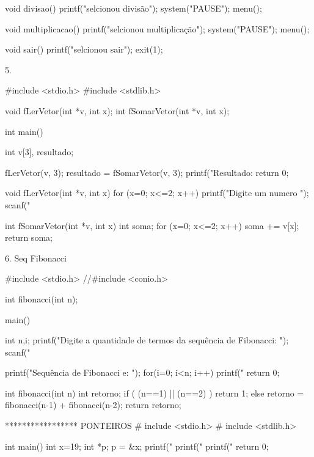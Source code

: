 void divisao(){
	printf("selcionou divisão");
	system("PAUSE");
	menu();
}

void multiplicacao(){
	printf("selcionou multiplicação");
	system("PAUSE");
	menu();
}

void sair(){
	printf("selcionou sair");
	exit(1);
}

5.

#include <stdio.h>
#include <stdlib.h>

void fLerVetor(int *v, int x);
int fSomarVetor(int *v, int x);

int main()
{ int v[3], resultado;

  fLerVetor(v, 3);
  resultado = fSomarVetor(v, 3);
  printf("Resultado: %
  return 0;
}

void fLerVetor(int *v, int x){
	for (x=0; x<=2; x++)
	{
		printf("Digite um numero \n");
		scanf("%
	}
}

int fSomarVetor(int *v, int x){
	int soma;
	for (x=0; x<=2; x++)
	{
		soma += v[x];
	}
	return soma;
}

6. Seq Fibonacci

#include <stdio.h>
//#include <conio.h> 

int fibonacci(int n);

main()
{
   int n,i;
   printf("Digite a quantidade de termos da sequência de Fibonacci: ");
   scanf("%

   printf("\nA Sequência de Fibonacci e: \n");
   for(i=0; i<n; i++)
       printf("%
   return 0;
} 

int fibonacci(int n)
{ int retorno;
   if ( (n==1) || (n==2) )
       return 1;
   else { 
          retorno = fibonacci(n-1) + fibonacci(n-2);     
          return retorno; 
       }
}

***************** PONTEIROS
# include <stdio.h>
# include <stdlib.h>

int main()
{
	int x=19;
	int *p;
	p = &x;
	printf("%
	printf("%
	printf("%
	return 0;
}

